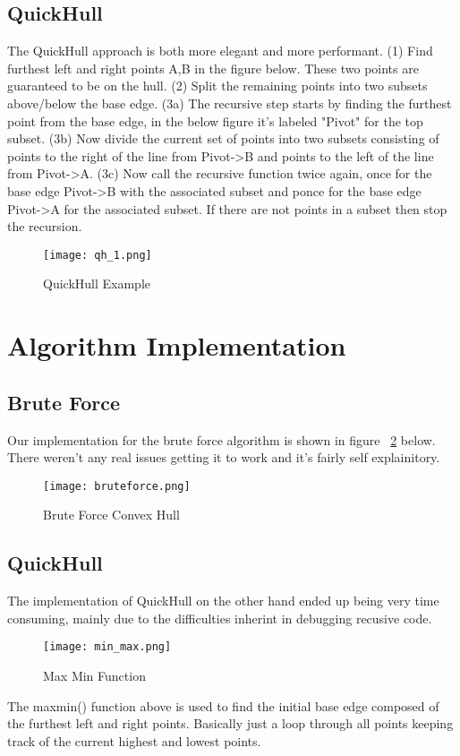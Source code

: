\documentclass[a4paper, 12pt]{article}
\begin{document}
{  \subsection{QuickHull}
  The QuickHull approach is both more elegant and more performant. (1) Find furthest left and right points A,B in the figure below. These two points are guaranteed to be on the hull.  (2) Split the remaining points into two subsets above/below the base edge. (3a) The recursive step starts by finding the furthest point from the base edge, in the below figure it's labeled "Pivot" for the top subset. (3b) Now divide the current set of points into two subsets consisting of points to the right of the line from Pivot->B and points to the left of the line from Pivot->A. (3c) Now call the recursive function twice again, once for the base edge Pivot->B with the associated subset and ponce for the base edge Pivot->A for the associated subset. If there are not points in a subset then stop the recursion. 
  \begin{figure}[H]
  \begin{center}
    \texttt{[image: qh\_1.png]}
\end{center}
\caption{QuickHull Example}
    \label{fig:qh_1}
  \end{figure} 
  \section{Algorithm Implementation}
  \subsection{Brute Force}

  Our implementation for the brute force algorithm is shown in figure ~\ref{fig:bruteforce} below. There weren't any real issues getting it to work and it's fairly self explainitory.
  \begin{figure}[H]
  \begin{center}
    \texttt{[image: bruteforce.png]}
\end{center}
    \caption{Brute Force Convex Hull}
    \label{fig:bruteforce}
  \end{figure} 
  \subsection{QuickHull}
 The implementation of QuickHull on the other hand ended up being very time consuming, mainly due to the difficulties inherint in debugging recusive code.  
  \begin{figure}[H]
  \begin{center}
    \texttt{[image: min\_max.png]}
  \end{center}
    \caption{Max Min Function}
    \label{fig:min_max}
  \end{figure} 
  The maxmin() function above is used to find the initial base edge composed of the furthest left and right points. Basically just a loop through all points keeping track of the current highest and lowest points. 

}
\end{document}
